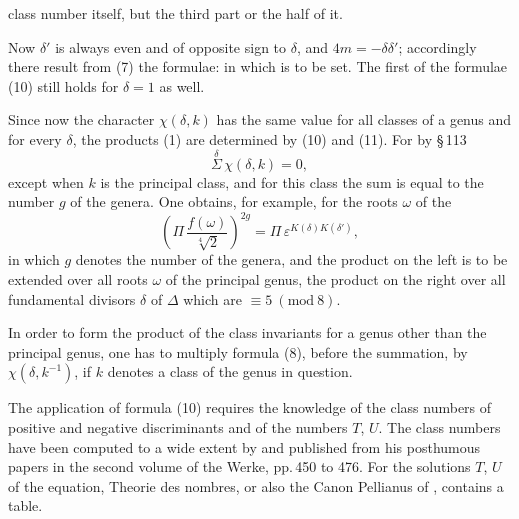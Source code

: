 class number itself, but the third part or the half of it.

Now $\delta'$ is always even and of opposite sign to $\delta$, and $4m=-\delta\delta'$; accordingly there result from (7) the formulae:
in which
is to be set. The first of the formulae (10) still holds for $\delta=1$ as well.

Since now the character $\chi(\delta,k)$ has the same value for all classes of a genus and for every $\delta$, the products (1) are determined by (10) and (11). For by \S\,113
\[
\overset{\delta}{\Sigma}\,\chi(\delta,k) = 0,
\]
except when $k$ is the principal class, and for this class the sum is equal to the number $g$ of the genera. One obtains, for example, for the roots $\omega$ of the 
\[
\left(\Pi\,\frac{f(\omega)}{\sqrt[4]{2}}\right)^{2g} = \Pi\,\varepsilon^{K(\delta)K(\delta')},
\]
in which $g$ denotes the number of the genera, and the product on the left is to be extended over all roots $\omega$ of the principal genus, the product on the right over all fundamental divisors $\delta$ of $\Delta$ which are $\equiv 5\ (\mathrm{mod}\ 8)$.

In order to form the product of the class invariants for a genus other than the principal genus, one has to multiply formula (8), before the summation, by $\chi(\delta,k^{-1})$, if $k$ denotes a class of the genus in question.

The application of formula (10) requires the knowledge of the class numbers of positive and negative discriminants and of the numbers $T$, $U$. The class numbers have been computed to a wide extent by  and published from his posthumous papers in the second volume of the Werke, pp.\,450 to 476. For the solutions $T$, $U$ of the  equation,  \glqq Theorie des nombres\grqq{}, or also the \glqq Canon Pellianus\grqq{} of , contains a table.
